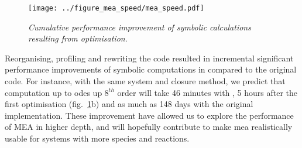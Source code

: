\begin{figure}[tbh]

\texttt{[image: ../figure\_mea\_speed/mea\_speed.pdf]}
\caption{\emph{Cumulative performance improvement of symbolic 
calculations resulting from optimisation}.
}
\label{fig:mea_speed}
\end{figure}



Reorganising, profiling and rewriting the code resulted in incremental significant performance improvements of symbolic computations in \means{} compared to the original \mat{} code.
For instance, with the same \pft{} system and closure method, 
we predict that computation up to \gls{ode}s up $8^{th}$ order will take 46 minutes with \means{}, 5 hours after the first optimisation (fig.~\ref{fig:mea_speed}b) and as much as 148 days with the original implementation.
These improvement have allowed us to explore the performance of MEA in higher depth, and will hopefully contribute to make \gls{mea} realistically usable for systems with more species and reactions.

